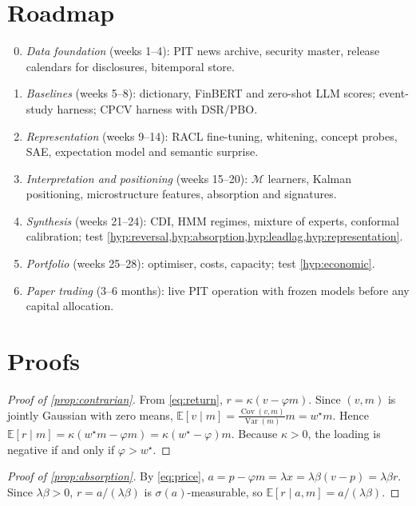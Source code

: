 \documentclass[11pt,a4paper]{article}
\theoremstyle{plain}
\theoremstyle{definition}
\theoremstyle{remark}
\newcommand{\E}{\mathbb{E}}
\DeclareMathOperator{\Var}{Var}
\DeclareMathOperator{\Cov}{Cov}
\begin{document}
\section{Roadmap}\label{sec:roadmap}
\begin{enumerate}[label=\textbf{Phase \arabic*.},leftmargin=*]
  \setcounter{enumi}{-1}
  \item \emph{Data foundation} (weeks 1--4): PIT news archive, security master, release calendars for disclosures, bitemporal store.
  \item \emph{Baselines} (weeks 5--8): dictionary, FinBERT and zero-shot LLM scores; event-study harness; CPCV harness with DSR/PBO.
  \item \emph{Representation} (weeks 9--14): RACL fine-tuning, whitening, concept probes, SAE, expectation model and semantic surprise.
  \item \emph{Interpretation and positioning} (weeks 15--20): $\mathcal{M}$ learners, Kalman positioning, microstructure features, absorption and signatures.
  \item \emph{Synthesis} (weeks 21--24): CDI, HMM regimes, mixture of experts, conformal calibration; test \cref{hyp:reversal,hyp:absorption,hyp:leadlag,hyp:representation}.
  \item \emph{Portfolio} (weeks 25--28): optimiser, costs, capacity; test \cref{hyp:economic}.
  \item \emph{Paper trading} (3--6 months): live PIT operation with frozen models before any capital allocation.
\end{enumerate}

\appendix
\section{Proofs}\label{app:proofs}

\begin{proof}[Proof of \cref{prop:contrarian}]
From \eqref{eq:return}, $r=\kappa(v-\varphi m)$. Since $(v,m)$ is jointly Gaussian with zero means, $\E[v\mid m]=\frac{\Cov(v,m)}{\Var(m)}m=w^\star m$. Hence $\E[r\mid m]=\kappa(w^\star m-\varphi m)=\kappa(w^\star-\varphi)m$. Because $\kappa>0$, the loading is negative if and only if $\varphi>w^\star$.
\end{proof}

\begin{proof}[Proof of \cref{prop:absorption}]
By \eqref{eq:price}, $a=p-\varphi m=\lambda x=\lambda\beta(v-p)=\lambda\beta r$. Since $\lambda\beta>0$, $r=a/(\lambda\beta)$ is $\sigma(a)$-measurable, so $\E[r\mid a,m]=a/(\lambda\beta)$.
\end{proof}
\end{document}
